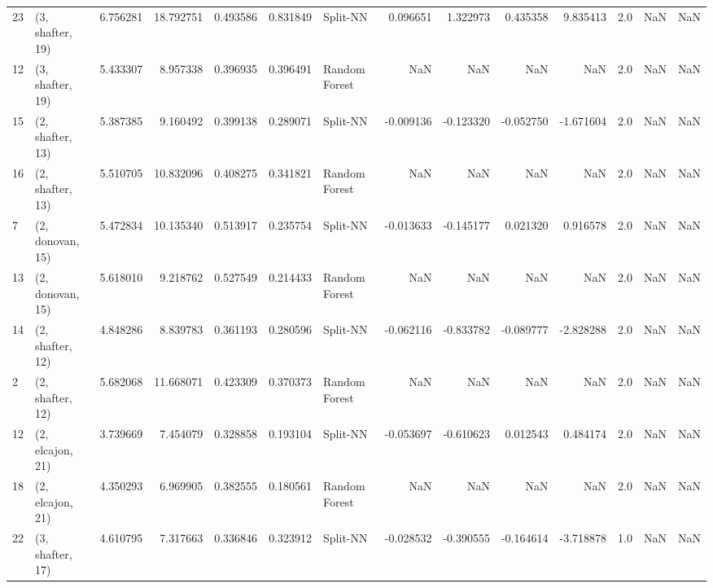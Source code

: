 \begin{tabular}{llrrrrlrrrrrrl}
23 &  (3, shafter, 19) &   6.756281 &  18.792751 &   0.493586 &  0.831849 &       Split-NN &        0.096651 &      1.322973 &       0.435358 &     9.835413 &            2.0 &    NaN &              NaN \\
12 &  (3, shafter, 19) &   5.433307 &   8.957338 &   0.396935 &  0.396491 &  Random Forest &             NaN &           NaN &            NaN &          NaN &            2.0 &    NaN &              NaN \\
15 &  (2, shafter, 13) &   5.387385 &   9.160492 &   0.399138 &  0.289071 &       Split-NN &       -0.009136 &     -0.123320 &      -0.052750 &    -1.671604 &            2.0 &    NaN &              NaN \\
16 &  (2, shafter, 13) &   5.510705 &  10.832096 &   0.408275 &  0.341821 &  Random Forest &             NaN &           NaN &            NaN &          NaN &            2.0 &    NaN &              NaN \\
7  &  (2, donovan, 15) &   5.472834 &  10.135340 &   0.513917 &  0.235754 &       Split-NN &       -0.013633 &     -0.145177 &       0.021320 &     0.916578 &            2.0 &    NaN &              NaN \\
13 &  (2, donovan, 15) &   5.618010 &   9.218762 &   0.527549 &  0.214433 &  Random Forest &             NaN &           NaN &            NaN &          NaN &            2.0 &    NaN &              NaN \\
14 &  (2, shafter, 12) &   4.848286 &   8.839783 &   0.361193 &  0.280596 &       Split-NN &       -0.062116 &     -0.833782 &      -0.089777 &    -2.828288 &            2.0 &    NaN &              NaN \\
2  &  (2, shafter, 12) &   5.682068 &  11.668071 &   0.423309 &  0.370373 &  Random Forest &             NaN &           NaN &            NaN &          NaN &            2.0 &    NaN &              NaN \\
12 &  (2, elcajon, 21) &   3.739669 &   7.454079 &   0.328858 &  0.193104 &       Split-NN &       -0.053697 &     -0.610623 &       0.012543 &     0.484174 &            2.0 &    NaN &              NaN \\
18 &  (2, elcajon, 21) &   4.350293 &   6.969905 &   0.382555 &  0.180561 &  Random Forest &             NaN &           NaN &            NaN &          NaN &            2.0 &    NaN &              NaN \\
22 &  (3, shafter, 17) &   4.610795 &   7.317663 &   0.336846 &  0.323912 &       Split-NN &       -0.028532 &     -0.390555 &      -0.164614 &    -3.718878 &            1.0 &    NaN &              NaN \\

\end{tabular}
